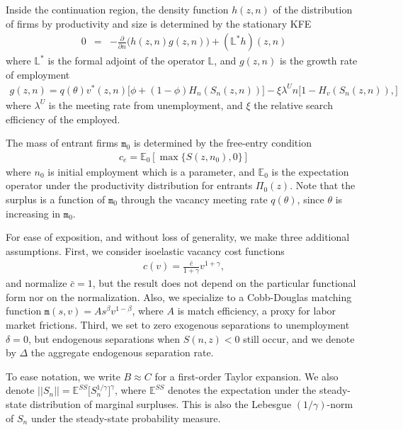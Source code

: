 Inside the continuation region, the density function $h(z,n)$ of the distribution of firms by productivity and size is determined by the stationary KFE
\begin{eqnarray*}
0 &=& - \frac{\partial}{\partial n} \Big( h(z,n) g(z,n) \Big) + \left(\mathbb{L}^*h\right)(z,n)
\end{eqnarray*}
where $\mathbb{L}^*$ is the formal adjoint of the operator $\mathbb{L}$, and $g(z,n)$ is the growth rate of employment
\begin{eqnarray}
g(z,n) = q(\theta) v^*(z,n) \Big[ \phi + (1-\phi) H_n(S_n(z,n)) \Big] - \xi \lambda^U n \Big[ 1 - H_v(S_n(z,n)), \Big]\label{appx:limit_emplgrowth}
\end{eqnarray}
where $\lambda^U$ is the meeting rate from unemployment, and $\xi$ the relative search efficiency of the employed.

The mass of entrant firms $\mathtt{m}_0$ is determined by the free-entry condition
\begin{eqnarray}
c_e = \mathbb{E}_0[\max\{S(z,n_0),0\}]\label{appx:limit_freeentry}
\end{eqnarray}
where $n_0$ is initial employment which is a parameter, and $\mathbb{E}_0$ is the expectation operator under the productivity distribution for entrants $\Pi_0(z)$.
Note that the surplus is a function of $\mathtt{m}_0$ through the vacancy meeting rate $q(\theta)$, since $\theta$ is increasing in $\mathtt{m}_0$.

For ease of exposition, and without loss of generality, we make three additional assumptions. First, we consider isoelastic vacancy cost functions
\begin{eqnarray*}
c(v) = \frac{\bar{c}}{1 + \gamma} v^{1+\gamma},
\end{eqnarray*}
and normalize $\bar{c}=1$, but the result does not depend on the particular
functional form nor on the normalization. Also, we specialize to a
Cobb-Douglas matching function $\mathtt{m}(s,v) = A s^\beta v^{1-\beta}$,
where $A$ is match efficiency, a proxy for labor market frictions.
Third, we set to zero exogenous separations to unemployment $\delta = 0$, but
endogenous separations when $S(n,z)<0$ still occur, and we denote by $\Delta$ the aggregate endogenous separation rate.

To ease notation, we write $B \approx C$ for a first-order Taylor expansion.
We also denote $||S_n|| = \mathbb{E}^{SS}\Big[S_n^{1/\gamma}\Big]^{\gamma}$, where $\mathbb{E}^{SS}$ denotes the expectation under the steady-state distribution of marginal surpluses. This is also the Lebesgue $(1/\gamma)$-norm of $S_n$ under the steady-state probability measure.

